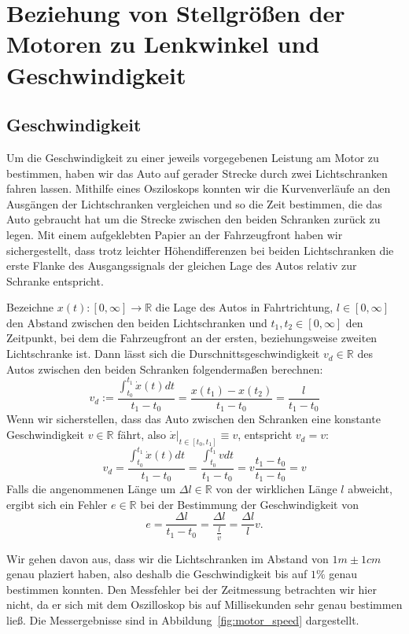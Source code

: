 \section{Beziehung von Stellgrößen der Motoren zu Lenkwinkel und Geschwindigkeit}
\subsection{Geschwindigkeit}
Um die Geschwindigkeit zu einer jeweils vorgegebenen Leistung am Motor zu bestimmen, haben wir das Auto auf gerader Strecke durch zwei Lichtschranken fahren lassen. Mithilfe eines Osziloskops konnten wir die Kurvenverläufe an den Ausgängen der Lichtschranken vergleichen und so die Zeit bestimmen, die das Auto gebraucht hat um die Strecke zwischen den beiden Schranken zurück zu legen. Mit einem aufgeklebten Papier an der Fahrzeugfront haben wir sichergestellt, dass trotz leichter Höhendifferenzen bei beiden Lichtschranken die erste Flanke des Ausgangssignals der gleichen Lage des Autos relativ zur Schranke entspricht.

Bezeichne $x(t): [0,\infty]\rightarrow \mathbb{R}$ die Lage des Autos in Fahrtrichtung, $l\in[0,\infty]$ den Abstand zwischen den beiden Lichtschranken und $t_1, t_2\in [0,\infty]$ den Zeitpunkt, bei dem die Fahrzeugfront an der ersten, beziehungsweise zweiten Lichtschranke ist. Dann lässt sich die Durschnittsgeschwindigkeit $v_d\in\mathbb{R}$ des Autos zwischen den beiden Schranken folgendermaßen berechnen:
\begin{equation*}
v_d := \frac{\int_{t_0}^{t_1}{\dot x(t) dt}}{t_1-t_0}=\frac{x(t_1)-x(t_2)}{t_1-t_0}=\frac{l}{t_1-t_0}
\end{equation*}
Wenn wir sicherstellen, dass das Auto zwischen den Schranken eine konstante Geschwindigkeit $v\in\mathbb{R}$ fährt, also $\dot x\vert_{t\in[t_0,t_1]}\equiv v$, entspricht $v_d=v$:
\begin{equation*}
v_d = \frac{\int_{t_0}^{t_1}{\dot x(t) dt}}{t_1-t_0} = \frac{\int_{t_0}^{t_1}{v dt}}{t_1-t_0}=v\frac{t_1-t_0}{t_1-t_0}=v
\end{equation*}
Falls die angenommenen Länge um $\Delta l\in\mathbb{R}$ von der wirklichen Länge $l$ abweicht, ergibt sich ein Fehler $e\in \mathbb{R}$ bei der Bestimmung der Geschwindigkeit von
\begin{equation*}
	e = \frac{\Delta l}{t_1-t_0} = \frac{\Delta l}{\frac{l}{v}} = \frac{\Delta l}{l}v.
\end{equation*}

Wir gehen davon aus, dass wir die Lichtschranken im Abstand von $1m\pm1cm$ genau plaziert haben, also deshalb die Geschwindigkeit bis auf $1\%$ genau bestimmen konnten. Den Messfehler bei der Zeitmessung betrachten wir hier nicht, da er sich mit dem Oszilloskop bis auf Millisekunden sehr genau bestimmen ließ. Die Messergebnisse sind in Abbildung~\ref{fig:motor_speed} dargestellt.



